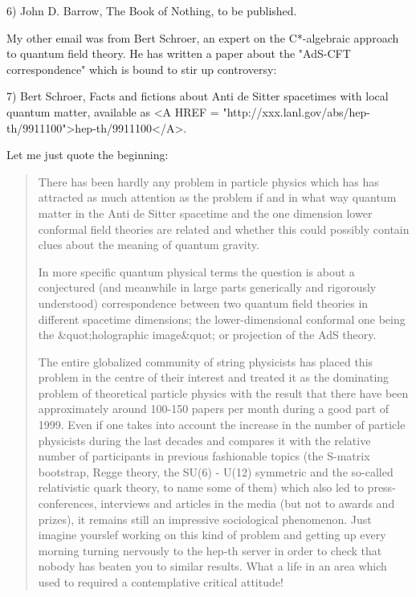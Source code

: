 6) John D. Barrow, The Book of Nothing, to be published.

My other email was from Bert Schroer, an expert on the C*-algebraic 
approach to quantum field theory.  He has written a paper about the
"AdS-CFT correspondence" which is bound to stir up controversy:

7) Bert Schroer, Facts and fictions about Anti de Sitter spacetimes
with local quantum matter, available as <A HREF = "http://xxx.lanl.gov/abs/hep-th/9911100">hep-th/9911100</A>.

Let me just quote the beginning:

\begin{quote}
      There has been hardly any problem in particle physics which has
      has attracted as much attention as the problem if and in what way
      quantum matter in the Anti de Sitter spacetime and the one dimension
      lower conformal field theories are related and whether this could
      possibly contain clues about the meaning of quantum gravity.

      In more specific quantum physical terms the question is about
      a conjectured (and meanwhile in large parts generically and 
      rigorously understood) correspondence between two quantum field 
      theories in different spacetime dimensions; the lower-dimensional
      conformal one being the &quot;holographic image&quot; or projection 
      of the AdS theory.
     
      The entire globalized community of string physicists has placed
      this problem in the centre of their interest and treated it as
      the dominating problem of theoretical particle physics with the
      result that there have been approximately around 100-150 papers
      per month during a good part of 1999.  Even if one takes into 
      account the increase in the number of particle physicists during
      the last decades and compares it with the relative number of
      participants in previous fashionable topics (the S-matrix bootstrap,
      Regge theory, the SU(6) - U(12) symmetric and the so-called
      relativistic quark theory, to name some of them) which also led
      to press-conferences, interviews and articles in the media (but
      not to awards and prizes), it remains still an impressive sociological
      phenomenon.  Just imagine yourslef working on this kind of problem
      and getting up every morning turning nervously to the hep-th server 
      in order to check that nobody has beaten you to similar results.  
      What a life in an area which used to required a contemplative 
      critical attitude!
  

\end{quote}

